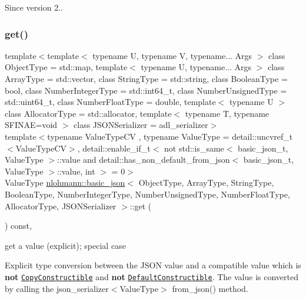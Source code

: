 \begin{DoxySince}{Since}
version 2.. 
\end{DoxySince}
\mbox{\label{classnlohmann_1_1basic__json_ab728c42baff9d11409d4f99d9f95d6af}} 
\subsubsection{\texorpdfstring{get()}{get()}\hspace{0.1cm}{\footnotesize\ttfamily [3/5]}}
{\footnotesize\ttfamily template$<$template$<$ typename U, typename V, typename... Args $>$ class Object\+Type = std\+::map, template$<$ typename U, typename... Args $>$ class Array\+Type = std\+::vector, class String\+Type  = std\+::string, class Boolean\+Type  = bool, class Number\+Integer\+Type  = std\+::int64\+\_\+t, class Number\+Unsigned\+Type  = std\+::uint64\+\_\+t, class Number\+Float\+Type  = double, template$<$ typename U $>$ class Allocator\+Type = std\+::allocator, template$<$ typename T, typename S\+F\+I\+N\+A\+E=void $>$ class J\+S\+O\+N\+Serializer = adl\+\_\+serializer$>$ \\
template$<$typename Value\+Type\+CV , typename Value\+Type  = detail\+::uncvref\+\_\+t$<$\+Value\+Type\+C\+V$>$, detail\+::enable\+\_\+if\+\_\+t$<$ not std\+::is\+\_\+same$<$ basic\+\_\+json\+\_\+t, Value\+Type $>$\+::value and detail\+::has\+\_\+non\+\_\+default\+\_\+from\+\_\+json$<$ basic\+\_\+json\+\_\+t, Value\+Type $>$\+::value, int $>$  = 0$>$ \\
Value\+Type \mbox{\hyperlink{classnlohmann_1_1basic__json}{nlohmann\+::basic\+\_\+json}}$<$ Object\+Type, Array\+Type, String\+Type, Boolean\+Type, Number\+Integer\+Type, Number\+Unsigned\+Type, Number\+Float\+Type, Allocator\+Type, J\+S\+O\+N\+Serializer $>$\+::get (\begin{DoxyParamCaption}{ }\end{DoxyParamCaption}) const\hspace{0.3cm}{\ttfamily [inline]}, {\ttfamily [noexcept]}}



get a value (explicit); special case 

Explicit type conversion between the J\+S\+ON value and a compatible value which is {\bfseries not} \href{http://en.cppreference.com/w/cpp/concept/CopyConstructible}{\tt Copy\+Constructible} and {\bfseries not} \href{http://en.cppreference.com/w/cpp/concept/DefaultConstructible}{\tt Default\+Constructible}. The value is converted by calling the json\+\_\+serializer$<$\+Value\+Type$>$ {\ttfamily from\+\_\+json()} method.

